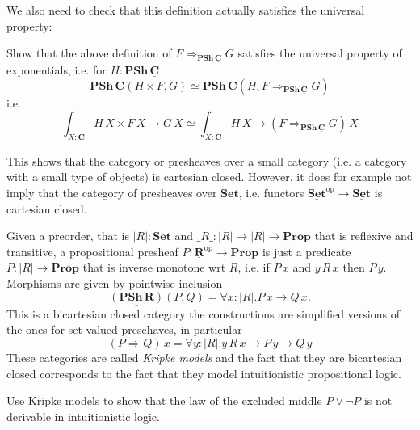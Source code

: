 \documentclass{article}
\newcommand{\Prop}{\mathbf{Prop}}
\newcommand{\Set}{\mathbf{Set}}
\newcommand{\cat}[1]{\underline{\mathbf{#1}}}
\newcommand{\obj}[1]{|#1|}
\newcommand{\homC}[3]{\cat{#1}(#2,#3)}
\newcommand{\op}{\mathrm{op}}
\newcommand{\PSh}{\mathbf{PSh}}
\newcommand{\expC}[3]{#2\Rightarrow_{#1} #3}
\newcommand{\expX}[2]{\expC{}{#1}{#2}}
\begin{document}
We also need to check that this definition actually satisfies the universal property:
\begin{Exercise}
  Show that the above definition of $\expC{\PSh\,\cat{C}}{F}{G}$ satisfies the universal property of exponentials, i.e. for $H : \PSh\,\cat{C}$
  \[ \PSh\,\cat{C}(H \times F,G) \simeq \PSh\,\cat{C}(H, \expC{\PSh\,\cat{C}}{F}{G})\]
  i.e.
  \[ \int_{X:\cat{C}}H\,X \times F\,X \to G\,X \simeq
    \int_{X:\cat{C}}H\,X \to (\expC{\PSh\,\cat{C}}{F}{G})\,X\]
\end{Exercise}

This shows that the category or presheaves over a small category (i.e. a category with a small type of objects) is cartesian closed. However, it does for example not imply that the category of presheaves over $\Set$, i.e. functors $\cat{\Set}^\op \to \cat{\Set}$ is cartesian closed. 

Given a preorder, that is $|R|:\Set$ and $\_R\_ : |R| \to |R| \to \Prop$ that is reflexive and transitive, a propositional presheaf $P : \cat{R}^\op \to \Prop$ is just a predicate $P : |R| \to \Prop$ that is inverse monotone wrt $R$, i.e. if $P\,x$ and $y\,R\,x$ then $P\,y$. Morphisms are given by pointwise inclusion 
\[\homC{(\PSh\,R)}{P}{Q} = \forall x:|R|.P\,x \to Q\,x.\]
This is a bicartesian closed category the constructions are simplified versions of the ones for set valued presehaves, in particular 
\[(\expX{P}{Q})\,x = \forall y:|R|.y\,R\,x\to P\,y \to Q\,y \]
These categories are called \emph{Kripke models} and the fact that they are bicartesian closed corresponds to the fact that they model intuitionistic propositional logic.
\begin{Exercise}
  Use Kripke models to show that the law of the excluded middle $P \vee \neg P$ is not derivable in intuitionistic logic. 
\end{Exercise}

\end{document}
